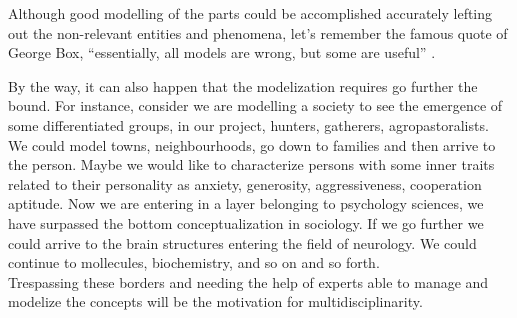\documentclass[11pt,oneside,a4paper,openright]{report}
\begin{document}
% 
%

Although good modelling of the parts could be accomplished accurately lefting out the non-relevant entities and phenomena, let's remember the famous quote of George Box, ``essentially, all models are wrong, but some are useful'' \cite[p.2]{Box1979}.


By the way, it can also happen that the modelization requires go further the bound. For instance, consider we are modelling a society to see the emergence of some differentiated groups, in our project, hunters, gatherers, agropastoralists. 
We could model towns, neighbourhoods, go down to families and then arrive to the person. Maybe we would like to characterize persons with some inner traits related to their personality as anxiety, generosity, aggressiveness, cooperation aptitude. Now we are entering in a layer belonging to psychology sciences, we have surpassed the bottom conceptualization in sociology. If we go further we could arrive to the brain structures entering the field of neurology. We could continue to mollecules, biochemistry, and so on and so forth\cite[p.56]{MWilliams1999}.\\
Trespassing these borders and needing the help of experts able to manage and modelize the concepts will be the motivation for multidisciplinarity. 

\end{document}
